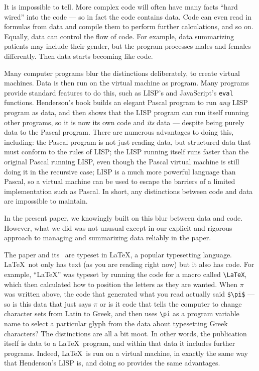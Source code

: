 \documentclass{article}
\begin{document}
It is impossible to tell. More complex code will often have many facts ``hard wired'' into the code --- so in fact the code contains data. Code can even read in formulas from data and compile them to perform further calculations, and so on. Equally, data can control the flow of code. For example, data summarizing patients may include their gender, but the program processes males and females differently. Then data starts becoming like code. 

{Many computer programs blur the distinctions deliberately, to create virtual machines. Data is then run on the virtual machine as program. Many programs provide standard features to do this, such as LISP's and JavaScript's \texttt{eval} functions. Henderson's book \cite{henderson} builds an elegant Pascal program to run \emph{any\/} LISP program as data, and then shows that the LISP program can run itself running other programs, so it is now its own code and \emph{its\/} data --- despite being purely data to the Pascal program. There are numerous advantages to doing this, including: the Pascal program is not just reading data, but structured data that must conform to the rules of LISP; the LISP running itself runs faster than the original Pascal running LISP, even though the Pascal virtual machine is still doing it in the recursive case; LISP is a much more powerful language than Pascal, so a virtual machine can be used to escape the barriers of a limited implementation such as Pascal. In short, any distinctions between code and data are impossible to maintain.}

In the present paper, we knowingly built on this blur between data and code. However, what we did was not unusual except in our explicit and rigorous approach to managing and summarizing data reliably in the paper.

The paper and its \supplement\ are typeset in \LaTeX, a popular typesetting language. \LaTeX\ not only has text (as you are reading right now) but it also has code. For example, ``\LaTeX'' was typeset by running the code for a macro called \verb|\LaTeX|, which then calculated how to position the letters as they are wanted. When $\pi$ was written above, the code that generated what you read actually said \verb|$\pi$| --- so is this data that just says $\pi$ or is it code that tells the computer to change character sets from Latin to Greek, and then uses \verb|\pi| as a program variable name to select a particular glyph from the data about typesetting Greek characters? The distinctions are all a bit moot. In other words, the publication itself is data to a \LaTeX\ program, and within that data it includes further programs. Indeed, \LaTeX\ is run on a virtual machine, in exactly the same way that Henderson's LISP is, and doing so provides the same advantages.
\end{document}
